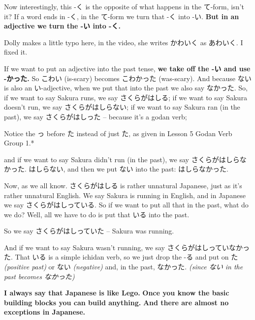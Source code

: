 {}

Now interestingly, this -く is the opposite of what happens in the て-form, isn't it? If a word ends in -く, in the て-form we turn that -く into -い. {\bf But in an adjective we turn the -い into -く.}

Dolly makes a little typo here, in the video, she writes かわいく as あわいく. I fixed it.

\stopsectionlevel

\startsectionlevel[title={Adjectives in the past tense},reference={adjectives-in-the-past-tense}]

If we want to put an adjective into the past tense, {\bf we take off the -い and use -かった.} So こわい (is-scary) becomes こわかった (was-scary). And because ない is also an い-adjective, when we put that into the past we also say なかった. So, if we want to say Sakura runs, we say さくらがはしる; if we want to say Sakura doesn't run, we say さくらがはしらない; if we want to say Sakura ran (in the past), we say さくらがはしった -- because it's a godan verb;

Notice the っ before た instead of just た, as given in Lesson 5 Godan Verb Group 1.*

and if we want to say Sakura didn't run (in the past), we say さくらがはしらなかった. はしらない, and then we put ない into the past: はしらなかった.

{}

Now, as we all know. さくらがはしる is rather unnatural Japanese, just as it's rather unnatural English. We say Sakura is running in English, and in Japanese we say さくらがはしっている. So if we want to put all that in the past, what do we do? Well, all we have to do is put that いる into the past.

So we say さくらがはしっていた -- Sakura was running.

{}

And if we want to say Sakura wasn't running, we say さくらがはしっていなかった. That いる is a simple ichidan verb, so we just drop the -る and put on た {\em (positive past)} or ない {\em (negative)} and, in the past, なかった. {\em (since ない in the past becomes なかった)}

{}

{\bf I always say that Japanese is like Lego.} {\bf Once you know the basic building blocks you can build anything.} {\bf And there are almost no exceptions in Japanese.}

